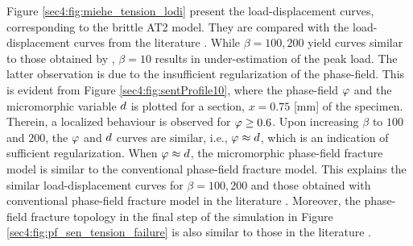 \documentclass[11pt]{article}
\begin{document}
Figure \ref{sec4:fig:miehe_tension_lodi} present the load-displacement curves, corresponding to the brittle AT2 model. They are compared with the load-displacement curves from the literature \cite{Miehe2010,Ambati2015,KRISTENSEN2020104093}. While $\beta = 100, 200$ yield curves similar to those obtained by \cite{Ambati2015}, $\beta = 10$ results in under-estimation of the peak load. The latter observation is due to the insufficient regularization of the phase-field. This is evident from Figure \ref{sec4:fig:sentProfile10}, where the phase-field $\hbox{$\varphi$}$ and the micromorphic variable $\hbox{$d$}$ is plotted for a section, $x = 0.75$ [mm] of the specimen. Therein, a localized behaviour is observed for $\hbox{$\varphi$} \geq 0.6$. Upon increasing $\beta$ to $100$ and $200$, the $\hbox{$\varphi$}$ and $\hbox{$d$}$ curves are similar, i.e., $\hbox{$\varphi$} \approx \hbox{$d$}$, which is an indication of sufficient regularization. When $\hbox{$\varphi$} \approx \hbox{$d$}$, the micromorphic phase-field fracture model is similar to the conventional phase-field fracture model. This explains the similar load-displacement curves for $\beta = 100,200$ and those obtained with conventional phase-field fracture model in the literature \cite{Miehe2010,Ambati2015,KRISTENSEN2020104093}. Moreover, the phase-field fracture topology in the final step of the simulation in Figure \ref{sec4:fig:pf_sen_tension_failure} is also similar to those in the literature \cite{Miehe2010,Ambati2015,KRISTENSEN2020104093}.
\end{document}
